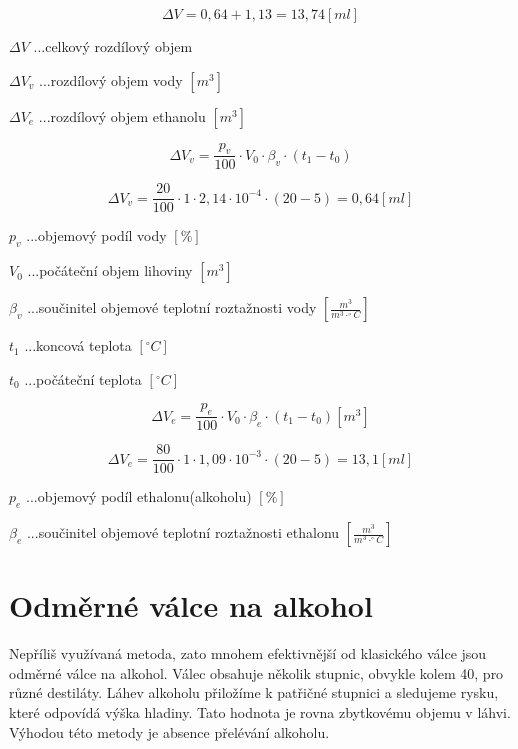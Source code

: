 \[\Delta V = 0,64 + 1,13 = 13,74 \left[ml\right]\]


\(\Delta V\) ...celkový rozdílový objem

\(\Delta V_{v}\) ...rozdílový objem vody \([m^3]\)

\(\Delta V_{e}\) ...rozdílový objem ethanolu \([m^3]\)


\begin{equation}
    \Delta V_v = \frac{p_v}{100} \cdot V_0 \cdot \beta_v \cdot (t_1 - t_0)
\end{equation}

\[\Delta V_v = \frac{20}{100} \cdot 1 \cdot  2,14 \cdot 10^{-4} \cdot (20 - 5) = 0,64 \left[ml\right]\]

\(p_v\) ...objemový podíl vody \([\%]\) 

\(V_0\) ...počáteční objem lihoviny \([m^3]\)

\(\beta_v\) ...součinitel objemové teplotní roztažnosti vody \([\frac{m^3}{m^3 \cdot ^\circ C}]\)

\(t_1\) ...koncová teplota \([^\circ C]\)

\(t_0\) ...počáteční teplota \([^\circ C]\)

\begin{equation}
    \Delta V_e = \frac{p_e}{100} \cdot V_0 \cdot \beta_e \cdot (t_1 - t_0)\left[m^3\right] \label{objem_kapalina}
\end{equation}

\[\Delta V_e = \frac{80}{100} \cdot 1 \cdot  1,09 \cdot 10^{-3} \cdot (20 - 5) = 13,1 \left[ml\right]\]

\(p_e\) ...objemový podíl ethalonu(alkoholu) \([\%]\) 

\(\beta_e\) ...součinitel objemové teplotní roztažnosti ethalonu \([\frac{m^3}{m^3 \cdot ^\circ C}]\)




\section{Odměrné válce na alkohol}
\label{valec_na_alkohol}

Nepříliš využívaná metoda, zato mnohem efektivnější od klasického válce jsou odměrné válce na alkohol. Válec obsahuje několik stupnic, obvykle kolem 40, pro různé destiláty. Láhev alkoholu přiložíme k patřičné stupnici a sledujeme rysku, které odpovídá výška hladiny. Tato hodnota je rovna zbytkovému objemu v láhvi. Výhodou této metody je absence přelévání alkoholu.\\


